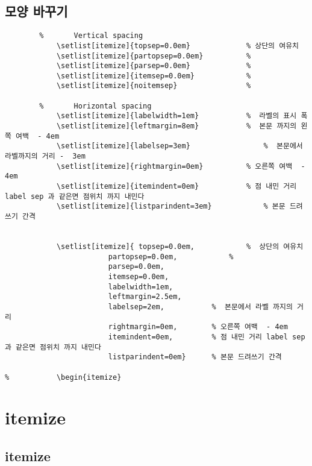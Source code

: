 \documentclass[12pt, a4paper, oneside]{book}
\let\stdsection\section
\renewcommand\section{\newpage\stdsection}
\begin{document}
	\section{모양 바꾸기}


		\begin{mdframed}[style=code_document, frametitle={code}]
			\begin{verbatim}
		%		Vertical spacing
			\setlist[itemize]{topsep=0.0em}				% 상단의 여유치
			\setlist[itemize]{partopsep=0.0em}			% 
			\setlist[itemize]{parsep=0.0em}				% 
			\setlist[itemize]{itemsep=0.0em}			% 
			\setlist[itemize]{noitemsep}				% 
			
		%		Horizontal spacing
			\setlist[itemize]{labelwidth=1em}			%  라벨의 표시 폭
			\setlist[itemize]{leftmargin=8em}			%  본문 까지의 왼쪽 여백  - 4em
			\setlist[itemize]{labelsep=3em} 				%  본문에서 라벨까지의 거리 -  3em
			\setlist[itemize]{rightmargin=0em}			% 오른쪽 여백  - 4em
			\setlist[itemize]{itemindent=0em} 			% 점 내민 거리 label sep 과 같은면 점위치 까지 내민다
			\setlist[itemize]{listparindent=3em}			% 본문 드려쓰기 간격
	
	
			\setlist[itemize]{ topsep=0.0em, 			%  상단의 여유치
						partopsep=0.0em, 			%  
						parsep=0.0em, 
						itemsep=0.0em, 
						labelwidth=1em, 
						leftmargin=2.5em,
						labelsep=2em,			%  본문에서 라벨 까지의 거리
						rightmargin=0em,		% 오른쪽 여백  - 4em
						itemindent=0em, 		% 점 내민 거리 label sep 과 같은면 점위치 까지 내민다
						listparindent=0em}		% 본문 드려쓰기 간격
	
%			\begin{itemize}
			\end{verbatim}
		\end{mdframed}

	

	


	\chapter{itemize}


	\section{itemize}
\end{document}
